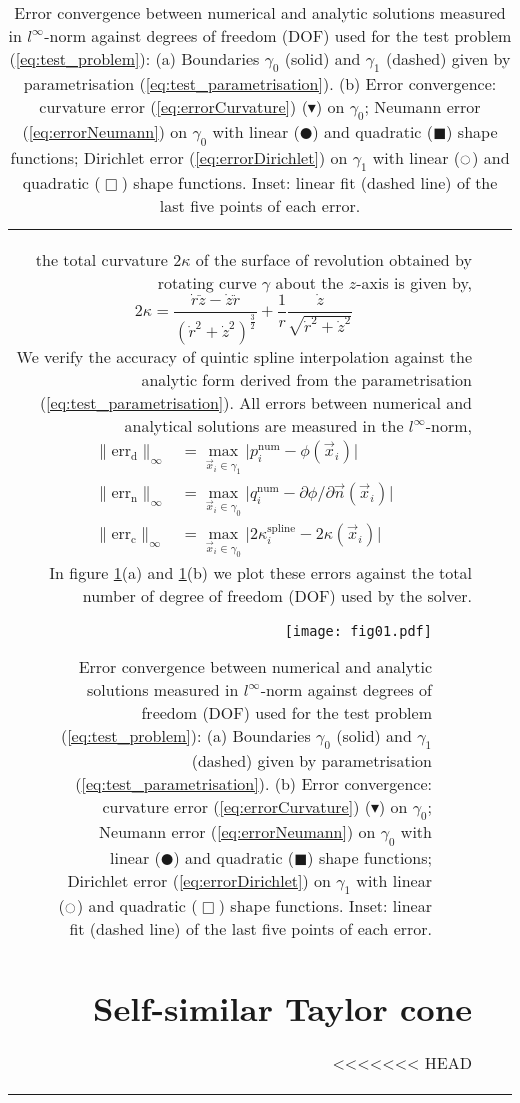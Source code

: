 \documentclass{jfm}
\begin{document}
\begin{table}
\begin{center}
\begin{tabular}{rl|l}
the total curvature $2\kappa$ of the surface of revolution obtained by rotating curve $\gamma$
about the $z$-axis is given by,
\begin{equation}
2\kappa= \frac{\dot{r}\ddot{z} - \dot{z}\ddot{r}}{(\dot{r}^2+\dot{z}^2)^{\frac{3}{2}}}
+\frac{1}{r}\frac{\dot{z}}{\sqrt{\dot{r}^2+\dot{z}^2}}
\end{equation}
We verify the accuracy of quintic spline interpolation against the analytic form derived from
the parametrisation (\ref{eq:test_parametrisation}). All errors between numerical and analytical solutions
are measured in the $l^\infty$-norm,
\begin{align}
\|\textrm{err}_\mathrm{d}\|_\infty &= 
\max_{\vec{x}_i\in \gamma_1}{\lvert p^\mathrm{num}_i-\phi(\vec{x}_i)\rvert}\label{eq:errorDirichlet}\\
\|\textrm{err}_\mathrm{n}\|_\infty &= 
\max_{\vec{x}_i\in \gamma_0}{\lvert q^\mathrm{num}_i-\partial\phi/\partial\vec{n}(\vec{x}_i)\rvert}\label{eq:errorNeumann}\\
\|\textrm{err}_\mathrm{c}\|_\infty &= 
\max_{\vec{x}_i\in \gamma_0}{\lvert 2\kappa^\mathrm{spline}_i-2\kappa(\vec{x}_i)\rvert}\label{eq:errorCurvature}
\end{align}
In figure \ref{fig:test_result}(a) and \ref{fig:test_result}(b) 
we plot these errors against the total number of degree of freedom (DOF) used by the solver.
\begin{figure}
  \centering
  \texttt{[image: fig01.pdf]}%
  \caption{
Error convergence  between numerical and analytic solutions measured in $l^\infty$-norm against degrees of freedom (DOF) used for the test problem (\ref{eq:test_problem}):
(a) Boundaries $\gamma_0$ (solid) and $\gamma_1$ (dashed) given 
by parametrisation (\ref{eq:test_parametrisation}).
(b) Error convergence: curvature error (\ref{eq:errorCurvature}) ($\blacktriangledown$) on $\gamma_0$;
Neumann error (\ref{eq:errorNeumann}) on $\gamma_0$ 
with linear ($\CIRCLE $) and quadratic ($\blacksquare$) shape functions;
Dirichlet error (\ref{eq:errorDirichlet})  on $\gamma_1$ 
with linear ($\ocircle $) and quadratic ($\Box$) shape functions.
Inset: linear fit (dashed line) of the last five points of each error.
  }
\label{fig:test_result}
\end{figure}

\section{Self-similar Taylor cone}
<<<<<<< HEAD

\end{tabular}
\end{center}
\end{table}
\end{document}
